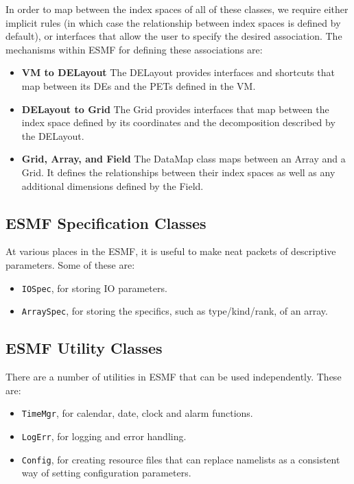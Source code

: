 In order to map between the index spaces of all of these classes,
we require either implicit rules (in which case the relationship 
between index spaces is defined by default), or interfaces that 
allow the user to specify the desired association.  The mechanisms
within ESMF for defining these associations are:

\begin{itemize}

\item {\bf VM to DELayout} The DELayout provides interfaces and 
shortcuts that map between its DEs and the PETs defined in the 
VM.

\item {\bf DELayout to Grid} The Grid provides interfaces that map 
between the index space defined by its coordinates and the decomposition 
described by the DELayout.

\item {\bf Grid, Array, and Field} The DataMap class maps between 
an Array and a Grid.  It defines the relationships between their
index spaces as well as any additional dimensions defined by the Field.

\end{itemize}

\subsection{ESMF Specification Classes}

At various places in the ESMF, it is useful to make neat packets
of descriptive parameters.  Some of these are:
\begin{itemize}
\item {\tt IOSpec}, for storing IO parameters.
\item {\tt ArraySpec}, for storing the specifics, such as type/kind/rank,
of an array.
\end{itemize}

\subsection{ESMF Utility Classes}

There are a number of utilities in ESMF that can be used independently.
These are:
\begin{itemize}
\item {\tt TimeMgr}, for calendar, date, clock and alarm functions.
\item {\tt LogErr}, for logging and error handling.
\item {\tt Config}, for creating resource files that can replace namelists
as a consistent way of setting configuration parameters.
\end{itemize}


